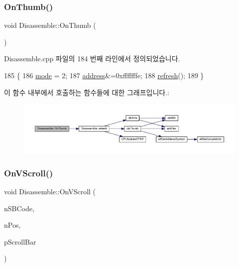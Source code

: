 \subsubsection{\texorpdfstring{On\+Thumb()}{OnThumb()}}
{\footnotesize\ttfamily void Disassemble\+::\+On\+Thumb (\begin{DoxyParamCaption}{ }\end{DoxyParamCaption})\hspace{0.3cm}{\ttfamily [protected]}}



Disassemble.\+cpp 파일의 184 번째 라인에서 정의되었습니다.


\begin{DoxyCode}
185 \{
186   \mbox{\hyperlink{class_disassemble_a30b707e1da3b01abda044e78929404cc}{mode}} = 2;
187   \mbox{\hyperlink{class_disassemble_a960ac8317ada7182e59132a3ee4afb48}{address}}&=0xfffffffe;
188   \mbox{\hyperlink{class_disassemble_a7cdf11d53ce0f170ad7dd8fc66961805}{refresh}}();
189 \}
\end{DoxyCode}
이 함수 내부에서 호출하는 함수들에 대한 그래프입니다.\+:
\nopagebreak
\begin{figure}[H]
\begin{center}
\leavevmode
\includegraphics[width=350pt]{class_disassemble_a480844a650f1a7ab4a396ff1ffdd5655_cgraph}
\end{center}
\end{figure}
\mbox{\label{class_disassemble_a96149abe6cfe456c0d799dfe59b19826}} 
\subsubsection{\texorpdfstring{On\+V\+Scroll()}{OnVScroll()}}
{\footnotesize\ttfamily void Disassemble\+::\+On\+V\+Scroll (\begin{DoxyParamCaption}\item[{U\+I\+NT}]{n\+S\+B\+Code,  }\item[{U\+I\+NT}]{n\+Pos,  }\item[{C\+Scroll\+Bar $\ast$}]{p\+Scroll\+Bar }\end{DoxyParamCaption})\hspace{0.3cm}{\ttfamily [protected]}}



